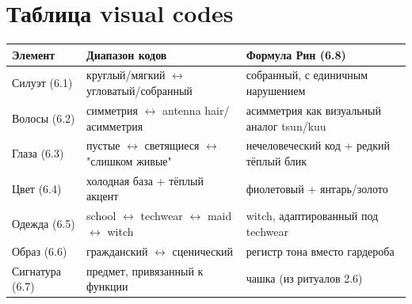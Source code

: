 \section{Таблица visual codes}

\begin{center}
\begin{tabular}{p{2.5cm}p{4.5cm}p{5cm}}
\textbf{Элемент} & \textbf{Диапазон кодов} & \textbf{Формула Рин (6.8)} \\
\hline
Силуэт (6.1) & круглый/мягкий $\leftrightarrow$ угловатый/собранный & собранный, с единичным нарушением \\
Волосы (6.2) & симметрия $\leftrightarrow$ antenna hair/асимметрия & асимметрия как визуальный аналог tsun/kuu \\
Глаза (6.3) & пустые $\leftrightarrow$ светящиеся $\leftrightarrow$ "слишком живые" & нечеловеческий код + редкий тёплый блик \\
Цвет (6.4) & холодная база + тёплый акцент & фиолетовый + янтарь/золото \\
Одежда (6.5) & school $\leftrightarrow$ techwear $\leftrightarrow$ maid $\leftrightarrow$ witch & witch, адаптированный под techwear \\
Образ (6.6) & гражданский $\leftrightarrow$ сценический & регистр тона вместо гардероба \\
Сигнатура (6.7) & предмет, привязанный к функции & чашка (из ритуалов 2.6) \\
\end{tabular}
\end{center}
